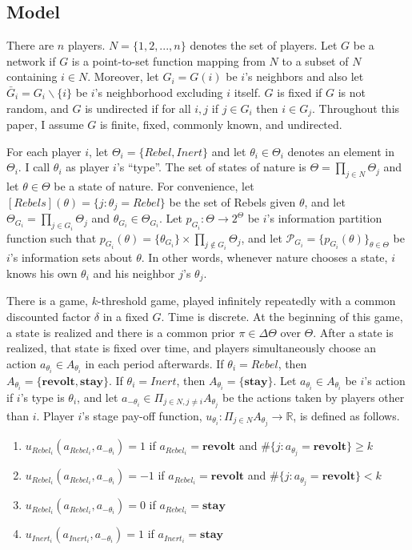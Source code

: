 \documentclass[12pt,letterpaper]{article}
\newtheorem*{main result}{Main Result}
\theoremstyle{definition}
\theoremstyle{remark}
\theoremstyle{claim}
\begin{document}
\subsection{Model}


There are $n$ players. $N=\{1,2,...,n\}$ denotes the set of players.  Let $G$ be a network if  $G$ is a point-to-set function mapping from $N$ to a subset of $N$ containing $i\in N$. Moreover,  let $G_i=G(i)$ be $i$'s neighbors and also let $\bar{G}_i=G_i\backslash \{i\}$ be $i$'s neighborhood excluding $i$ itself. $G$ is fixed if $G$ is not random, and $G$ is undirected if for all $i,j$ if $j\in G_i$ then $i\in G_j$. Throughout this paper, I assume $G$ is finite, fixed, commonly known, and undirected. 

For each player $i$, let $\Theta_i=\{Rebel,Inert\}$ and let $\theta_i\in \Theta_i$ denotes an element in $\Theta_i$. I call $\theta_i$ as player $i$'s ``type''. The set of states of nature is $\Theta=\prod_{j\in N}\Theta_j$ and let $\theta\in \Theta$ be a state of nature. For convenience, let $[Rebels](\theta)=\{j:\theta_j=Rebel\}$ be the set of Rebels given $\theta$, and let $\Theta_{G_i}=\prod_{j\in G_i}\Theta_j$ and $\theta_{G_i}\in \Theta_{G_i}$. Let $p_{G_i}:\Theta \rightarrow 2^{\Theta}$ be $i$'s information partition function such that $p_{G_i}(\theta)=\{\theta_{G_i}\}\times \prod_{j\not\in G_i}\Theta_j$, and let $\mathcal{P}_{G_i}=\{p_{G_i}(\theta)\}_{\theta\in \Theta}$ be $i$'s information sets about $\theta$. In other words, whenever nature chooses a state, $i$ knows his own $\theta_i$ and his neighbor $j$'s $\theta_j$. 

There is a game, $k$-threshold game, played infinitely repeatedly  with a common discounted factor $\delta$ in a fixed $G$. Time is discrete. At the beginning of this game, a state is realized and there is a common prior $\pi\in \Delta \Theta$ over $\Theta$. After a state is realized, that state is fixed over time, and players simultaneously choose an action $a_{\theta_i}\in A_{\theta_i}$ in each period afterwards. If $\theta_i=Rebel$, then $A_{\theta_i}=\{\textbf{revolt}, \textbf{stay}\}$.  If $\theta_i=Inert$, then $A_{\theta_i}=\{\textbf{stay}\}$. Let $a_{\theta_i}\in A_{\theta_i}$ be $i$'s action if $i$'s type is $\theta_i$, and let $a_{-\theta_i}\in \Pi_{j\in N,j\neq i}A_{\theta_j}$ be the actions taken by players other than $i$. Player $i$'s stage pay-off function, $u_{\theta_i}: \Pi_{j\in N}A_{\theta_j}\rightarrow \mathbb{R}$, is defined as follows. 
\begin{enumerate}
\item $u_{Rebel_i}(a_{Rebel_i},a_{-\theta_i})=1$ if $a_{Rebel_i}=\textbf{revolt}$ and $\#\{j:a_{\theta_j}=\textbf{revolt}\}\geq k$
\item $u_{Rebel_i}(a_{Rebel_i},a_{-\theta_i})=-1$ if $a_{Rebel_i}=\textbf{revolt}$ and $\#\{j:a_{\theta_j}=\textbf{revolt}\}< k$
\item $u_{Rebel_i}(a_{Rebel_i},a_{-\theta_i})=0$ if $a_{Rebel_i}=\textbf{stay}$
\item $u_{Inert_i}(a_{Inert_i},a_{-\theta_i})=1$ if $a_{Inert_i}=\textbf{stay}$
\end{enumerate}
\end{document}
